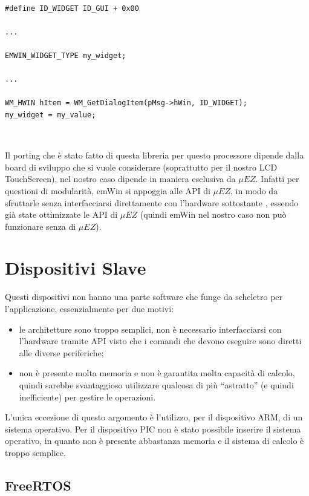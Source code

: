\documentclass[a4paper,titlepage]{book}
\begin{document}
\begin{lstlisting}

#define ID_WIDGET ID_GUI + 0x00

...

EMWIN_WIDGET_TYPE my_widget;

...

WM_HWIN hItem = WM_GetDialogItem(pMsg->hWin, ID_WIDGET);
my_widget = my_value; 

\end{lstlisting}

~

Il porting che è stato fatto di questa libreria per questo processore dipende dalla board di sviluppo che si vuole considerare (soprattutto per il nostro LCD TouchScreen), nel nostro caso dipende in maniera esclusiva da $\mu EZ$. Infatti per questioni di modularità, emWin si appoggia alle API di $\mu EZ$, in modo da sfruttarle senza interfacciarsi direttamente con l'hardware sottostante , essendo già state ottimizzate le API di $\mu EZ$ (quindi emWin nel nostro caso non può funzionare senza di $\mu EZ$).
 
\section{Dispositivi Slave}

Questi dispositivi non hanno una parte software che funge da scheletro per l'applicazione, essenzialmente per due motivi:

\begin{itemize}[noitemsep,topsep=18pt,parsep=10pt,partopsep=0pt]

\item le architetture sono troppo semplici, non è necessario interfacciarsi con l'hardware tramite API visto che i comandi che devono eseguire sono diretti alle diverse periferiche;
\item non è presente molta memoria e non è garantita molta capacità di calcolo, quindi sarebbe svantaggioso utilizzare qualcosa di più ``astratto'' (e quindi inefficiente) per gestire le operazioni.

\end{itemize}

L'unica eccezione di questo argomento è l'utilizzo, per il dispositivo ARM, di un sistema operativo. Per il dispositivo PIC non è stato possibile inserire il sistema operativo, in quanto non è presente abbastanza memoria e il sistema di calcolo è troppo semplice.

\subsection{FreeRTOS}
\end{document}
